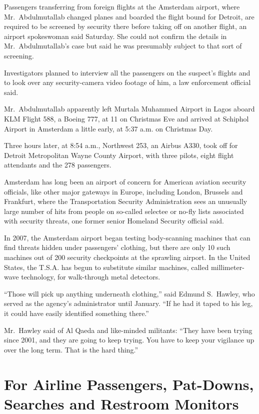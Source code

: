 ﻿\documentclass[12pt]{article}
\begin{document}
Passengers transferring from foreign flights at the Amsterdam airport, where Mr.~Abdulmutallab
changed planes and boarded the flight bound for Detroit, are required to be screened by security
there before taking off on another flight, an airport spokeswoman said Saturday. She could not
confirm the details in Mr.~Abdulmutallab's case but said he was presumably subject to that sort of
screening.

Investigators planned to interview all the passengers on the suspect's flights and to look over any
security-camera video footage of him, a law enforcement official said.

Mr.~Abdulmutallab apparently left Murtala Muhammed Airport in Lagos aboard KLM Flight 588, a Boeing
777, at 11 on Christmas Eve and arrived at Schiphol Airport in Amsterdam a little early, at 5:37
a.m. on Christmas Day.

Three hours later, at 8:54 a.m., Northwest 253, an Airbus A330, took off for Detroit Metropolitan
Wayne County Airport, with three pilots, eight flight attendants and the 278 passengers.

Amsterdam has long been an airport of concern for American aviation security officials, like other
major gateways in Europe, including London, Brussels and Frankfurt, where the Transportation
Security Administration sees an unusually large number of hits from people on so-called selectee or
no-fly lists associated with security threats, one former senior Homeland Security official said.

In 2007, the Amsterdam airport began testing body-scanning machines that can find threats hidden
under passengers' clothing, but there are only 10 such machines out of 200 security checkpoints at
the sprawling airport. In the United States, the T.S.A. has begun to substitute similar machines,
called millimeter-wave technology, for walk-through metal detectors.

``Those will pick up anything underneath clothing,'' said Edmund S.~Hawley, who served as the
agency's administrator until January. ``If he had it taped to his leg, it could have easily
identified something there.''

Mr.~Hawley said of Al Qaeda and like-minded militants: ``They have been trying since 2001, and they
are going to keep trying. You have to keep your vigilance up over the long term. That is the hard
thing.''

\section{For Airline Passengers, Pat-Downs, Searches and Restroom Monitors}
\end{document}
